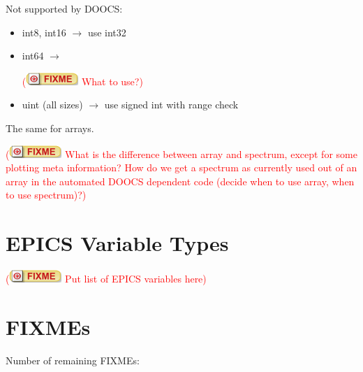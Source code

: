 \documentclass[11pt,a4paper]{scrartcl}
\newcounter{nFixmes}
\newcommand{\fixme}[1]{\addtocounter{nFixmes}{1}\textcolor{red}{(\includegraphics[height=2ex]{fixme} #1)}\xspace}
\begin{document}
Not supported by DOOCS:
\begin{itemize}
\item int8, int16 $\rightarrow$ use int32
\item int64 $\rightarrow$ \fixme{What to use?}
\item uint (all sizes) $\rightarrow$ use signed int with range check
\end{itemize}
The same for arrays.

\fixme{What is the difference between array and spectrum, except for some plotting meta information? How do we get a spectrum as currently used out of an array in the automated DOOCS dependent code (decide when to use array, when to use spectrum)?}

\section{EPICS Variable Types}
\fixme{Put list of EPICS variables here}

\section{FIXMEs}
Number of remaining FIXMEs: 
\end{document}
